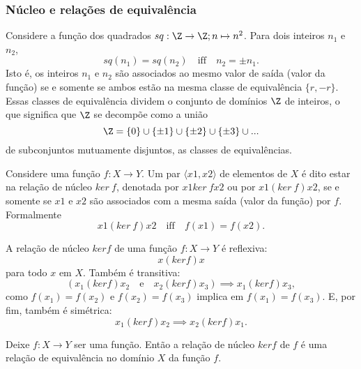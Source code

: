       \subsubsection{Núcleo e relações de equivalência}
         Considere a função dos quadrados $sq: \Z \to \Z; n\mapsto n^{2}$. Para dois inteiros $n_{1}$ e $n_{2}$, $$sq(n_{1}) = sq(n_{2})\quad \textrm{iff}\quad n_{2} = \pm n_{1}.$$
         Isto é, os inteiros $n_{1}$ e $n_{2}$ são associados ao mesmo valor de saída (valor da função) se e somente se ambos estão na mesma classe de equivalência $\{r, -r\}$. Essas classes de equivalência dividem o conjunto de domínios $\Z$ de inteiros, o que significa que $\Z$ se decompõe como a união 
         $$ \Z = \{0\} \cup \{\pm 1\} \cup \{\pm 2\} \cup \{\pm 3\} \cup ...$$
         de subconjuntos mutuamente disjuntos, as classes de equivalências.
         \begin{definition}
            Considere uma função $f: X \to Y$. Um par $\langle x{1}, x{2} \rangle$ de elementos de $X$ é dito estar na relação de núcleo $ker\ f$, denotada por $x{1} ker\ f x{2}$ ou por $x{1} (ker\ f) x{2}$, se e somente se $x{1}$ e $x{2}$ são associados com a mesma saída (valor da função) por $f$. Formalmente
            $$ x{1} (ker\ f) x{2}\quad \textrm{iff}\quad f(x{1}) = f(x{2}).$$
         \end{definition}
         A relação de núcleo $ker f$ de uma função $f: X \to Y$ é reflexiva: $$ x (ker f) x$$ para todo $x$ em $X$. Também é transitiva: $$\left(x_{1} (ker f) x_{2}\quad \textrm{e}\quad x_{2} (ker f) x_{3}\right) \implies x_{1} (ker f) x_{3},$$ como $f(x_{1}) = f(x_{2})$ e $f(x_{2}) = f(x_{3})$ implica em $f(x_{1}) = f(x_{3}).$ E, por fim, também é simétrica: $$ x_{1} (ker f) x_{2} \implies x_{2} (ker f) x_{1}.$$
         \begin{stat}
            Deixe $f: X \to Y$ ser uma função. Então a relação de núcleo $ker f$ de $f$ é uma relação de equivalência no domínio $X$ da função $f$.
         \end{stat}

